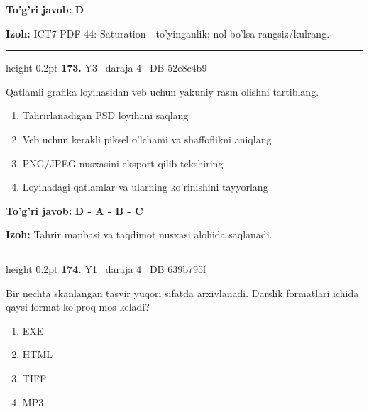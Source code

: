 \documentclass[10pt,a4paper,oneside]{article}
\begin{document}
\begin{tcolorbox}[enhanced,breakable,colback=teal!4,colframe=teal!45!black,boxrule=0.45pt,arc=1.2mm,left=2.8mm,right=2.8mm,top=2mm,bottom=2mm,before skip=2mm,after skip=2mm]
\textbf{\color{teal}To'g'ri javob:} \textbf{D}
\par\smallskip
\textbf{Izoh:} ICT7 PDF 44: Saturation - to'yinganlik; nol bo'lsa rangsiz/kulrang.
\end{tcolorbox}
\vspace{2mm}\hrule height 0.2pt \vspace{4mm}
\hypertarget{q173}{\textbf{\color{ink}173.}}  {\color{muted}\scriptsize Y3 \textbullet\ daraja 4 \textbullet\ DB 52e8c4b9}
\par
Qatlamli grafika loyihasidan veb uchun yakuniy rasm olishni tartiblang.
\begin{enumerate}[label=\Alph*),leftmargin=9mm]
\item Tahrirlanadigan PSD loyihani saqlang
\item Veb uchun kerakli piksel o'lchami va shaffoflikni aniqlang
\item PNG/JPEG nusxasini eksport qilib tekshiring
\item Loyihadagi qatlamlar va ularning ko'rinishini tayyorlang
\end{enumerate}
\begin{tcolorbox}[enhanced,breakable,colback=teal!4,colframe=teal!45!black,boxrule=0.45pt,arc=1.2mm,left=2.8mm,right=2.8mm,top=2mm,bottom=2mm,before skip=2mm,after skip=2mm]
\textbf{\color{teal}To'g'ri javob:} \textbf{D - A - B - C}
\par\smallskip
\textbf{Izoh:} Tahrir manbasi va taqdimot nusxasi alohida saqlanadi.
\end{tcolorbox}
\vspace{2mm}\hrule height 0.2pt \vspace{4mm}
\hypertarget{q174}{\textbf{\color{ink}174.}}  {\color{muted}\scriptsize Y1 \textbullet\ daraja 4 \textbullet\ DB 639b795f}
\par
Bir nechta skanlangan tasvir yuqori sifatda arxivlanadi. Darslik formatlari ichida qaysi format ko'proq mos keladi?
\begin{enumerate}[label=\Alph*),leftmargin=9mm]
\item EXE
\item HTML
\item TIFF
\item MP3
\end{enumerate}
\end{document}
